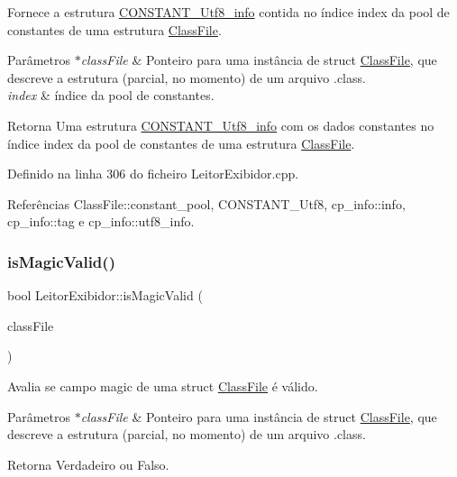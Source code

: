 Fornece a estrutura \hyperlink{structCONSTANT__Utf8__info}{C\+O\+N\+S\+T\+A\+N\+T\+\_\+\+Utf8\+\_\+info} contida no índice index da pool de constantes de uma estrutura \hyperlink{classClassFile}{Class\+File}. 
\begin{DoxyParams}{Parâmetros}
{\em $\ast$class\+File} & Ponteiro para uma instância de struct \hyperlink{classClassFile}{Class\+File}, que descreve a estrutura (parcial, no momento) de um arquivo .class. \\
\hline
{\em index} & índice da pool de constantes. \\
\hline
\end{DoxyParams}
\begin{DoxyReturn}{Retorna}
Uma estrutura \hyperlink{structCONSTANT__Utf8__info}{C\+O\+N\+S\+T\+A\+N\+T\+\_\+\+Utf8\+\_\+info} com os dados constantes no índice index da pool de constantes de uma estrutura \hyperlink{classClassFile}{Class\+File}. 
\end{DoxyReturn}


Definido na linha 306 do ficheiro Leitor\+Exibidor.\+cpp.



Referências Class\+File\+::constant\+\_\+pool, C\+O\+N\+S\+T\+A\+N\+T\+\_\+\+Utf8, cp\+\_\+info\+::info, cp\+\_\+info\+::tag e cp\+\_\+info\+::utf8\+\_\+info.

\mbox{\label{classLeitorExibidor_ad6afc52067f5e3542024c7b494ce3ae3}} 
\subsubsection{\texorpdfstring{is\+Magic\+Valid()}{isMagicValid()}}
{\footnotesize\ttfamily bool Leitor\+Exibidor\+::is\+Magic\+Valid (\begin{DoxyParamCaption}\item[{\hyperlink{classClassFile}{Class\+File} $\ast$}]{class\+File }\end{DoxyParamCaption})\hspace{0.3cm}{\ttfamily [private]}}

Avalia se campo magic de uma struct \hyperlink{classClassFile}{Class\+File} é válido. 
\begin{DoxyParams}{Parâmetros}
{\em $\ast$class\+File} & Ponteiro para uma instância de struct \hyperlink{classClassFile}{Class\+File}, que descreve a estrutura (parcial, no momento) de um arquivo .class. \\
\hline
\end{DoxyParams}
\begin{DoxyReturn}{Retorna}
Verdadeiro ou Falso. 
\end{DoxyReturn}


